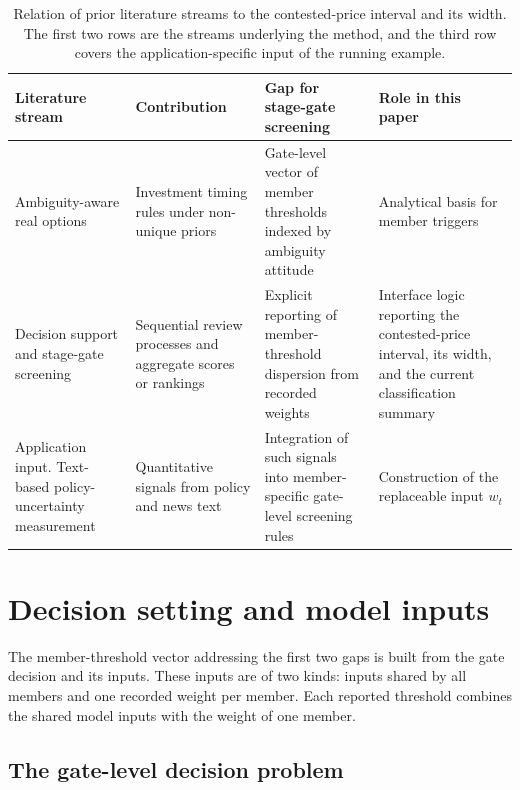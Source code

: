 \documentclass[5p,times,authoryear]{elsarticle}
\theoremstyle{plain}
\begin{document}
\begin{table}[!t]
\caption{Relation of prior literature streams to the contested-price interval and its width. The first two rows are the streams underlying the method, and the third row covers the application-specific input of the running example.}
\label{tab:lit}
\centering
\footnotesize
\renewcommand{\arraystretch}{1.15}
\begin{tabular}{@{}L{0.27\textwidth}L{0.18\textwidth}L{0.22\textwidth}L{0.25\textwidth}@{}}
\toprule
Literature stream & Contribution & Gap for stage-gate screening & Role in this paper\\
\midrule
Ambiguity-aware real options \citep{NishimuraOzaki2007,TrojanowskaKort2010,Schroder2011,Fan2023} & Investment timing rules under non-unique priors & Gate-level vector of member thresholds indexed by ambiguity attitude & Analytical basis for member triggers\\
Decision support and stage-gate screening \citep{Sprague1980,Cooper2008,ShenLi2023,Saiz2024,Shen2025,Violos2025} & Sequential review processes and aggregate scores or rankings & Explicit reporting of member-threshold dispersion from recorded weights & Interface logic reporting the contested-price interval, its width, and the current classification summary\\
Application input. Text-based policy-uncertainty measurement \citep{Baker2016,Gavriilidis2021,Ma2023,Hartley2025} & Quantitative signals from policy and news text & Integration of such signals into member-specific gate-level screening rules & Construction of the replaceable input $w_t$\\
\bottomrule
\end{tabular}
\end{table}

\section{Decision setting and model inputs}

The member-threshold vector addressing the first two gaps is built from the gate decision and its inputs. These inputs are of two kinds: inputs shared by all members and one recorded weight per member. Each reported threshold combines the shared model inputs with the weight of one member.

\subsection{The gate-level decision problem}
\end{document}

